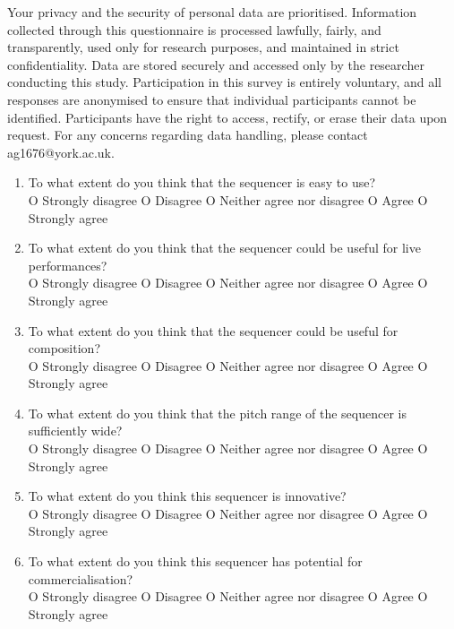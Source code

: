 \documentclass[12pt]{article}
\numberwithin{subsubsubsection}{subsubsection}
\begin{document}
Your privacy and the security of personal data are prioritised. Information collected through this questionnaire is processed lawfully, fairly, and transparently, used only for research purposes, and maintained in strict confidentiality. Data are stored securely and accessed only by the researcher conducting this study. Participation in this survey is entirely voluntary, and all responses are anonymised to ensure that individual participants cannot be identified. Participants have the right to access, rectify, or erase their data upon request. For any concerns regarding data handling, please contact ag1676@york.ac.uk.
\begin{enumerate}
\item To what extent do you think that the sequencer is easy to use? \\
O Strongly disagree O Disagree O Neither agree nor disagree O Agree O Strongly agree
\item To what extent do you think that the sequencer could be useful for live performances? \\
O Strongly disagree O Disagree O Neither agree nor disagree O Agree O Strongly agree
\item To what extent do you think that the sequencer could be useful for composition? \\
O Strongly disagree O Disagree O Neither agree nor disagree O Agree O Strongly agree
\item To what extent do you think that the pitch range of the sequencer is sufficiently wide?\\  
O Strongly disagree O Disagree O Neither agree nor disagree O Agree O Strongly agree

\item To what extent do you think this sequencer is innovative? \\  O Strongly disagree O Disagree O Neither agree nor disagree O Agree O Strongly agree  

\item To what extent do you think this sequencer has potential for commercialisation? \\ 
O Strongly disagree O Disagree O Neither agree nor disagree O Agree O Strongly agree  


\end{enumerate}
\end{document}
